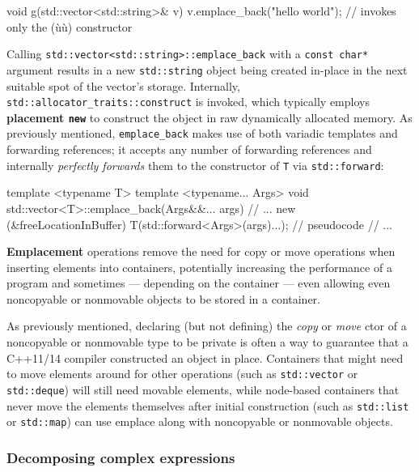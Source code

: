\begin{emcppslisting}
void g(std::vector<std::string>& v)
{
    v.emplace_back("hello world");
        // invokes only the (ù{}ù) constructor
}
\end{emcppslisting}

\noindent Calling \texttt{std::vector<std::string>::emplace\_back} with a
\texttt{const}~\texttt{char*} argument results in a new
\texttt{std::string} object being created in-place in the next suitable
spot of the vector's storage. Internally,
\texttt{std::allocator\_traits::construct} is invoked, which typically
employs \textbf{placement \texttt{new}} to construct the object in raw
dynamically allocated memory. As previously mentioned,
\texttt{emplace\_back} makes use of both variadic
templates and forwarding references; it accepts any
number of forwarding references and internally \textit{perfectly forwards} them
to the constructor of \texttt{T} via \texttt{std::forward}:

\begin{emcppslisting}
template <typename T>
template <typename... Args>
void std::vector<T>::emplace_back(Args&&... args)
{
    // ...
    new (&freeLocationInBuffer) T(std::forward<Args>(args)...);  // pseudocode
    // ...
}
\end{emcppslisting}

\noindent \textbf{Emplacement} operations remove the need for copy or move
operations when inserting elements into containers, potentially
increasing the performance of a program and sometimes --- depending on the
container --- even allowing even noncopyable or nonmovable objects to be stored
in a container.

As previously mentioned,
declaring (but not defining) the \emph{copy} or \emph{move} ctor of a
noncopyable or nonmovable type to be private is often a way to guarantee that
a C++11/14 compiler constructed an object in place.
Containers that might need to move elements around for other operations
(such as \texttt{std::vector} or \texttt{std::deque}) will still need
movable elements, while node-based containers that never move the
elements themselves after initial construction (such as
\texttt{std::list} or \texttt{std::map}) can use emplace along with
noncopyable or nonmovable objects.

\subsubsection[Decomposing complex expressions]{Decomposing complex expressions}\label{decomposing-complex-expressions}

